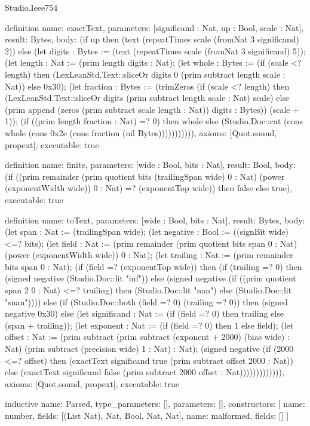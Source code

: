 \begin{lexlean}{Studio.Ieee754}
\begin{semanticmodule}
definition{
  name: exactText,
  parameters: [significand : Nat, up : Bool, scale : Nat],
  result: Bytes,
  body: (if up then (text (repeatTimes scale (fromNat 3 significand) 2)) else (let digits : Bytes := (text (repeatTimes scale (fromNat 3 significand) 5)); (let length : Nat := (prim length digits : Nat); (let whole : Bytes := (if (scale <? length) then (LexLeanStd.Text::sliceOr digits 0 (prim subtract length scale : Nat)) else 0x30); (let fraction : Bytes := (trimZeros (if (scale <? length) then (LexLeanStd.Text::sliceOr digits (prim subtract length scale : Nat) scale) else (prim append (zeros (prim subtract scale length : Nat)) digits : Bytes)) (scale + 1)); (if ((prim length fraction : Nat) =? 0) then whole else (Studio.Doc::cat (cons whole (cons 0x2e (cons fraction (nil Bytes))))))))))),
  axioms: [Quot.sound, propext],
  executable: true
}

definition{
  name: finite,
  parameters: [wide : Bool, bits : Nat],
  result: Bool,
  body: (if ((prim remainder (prim quotient bits (trailingSpan wide) 0 : Nat) (power (exponentWidth wide)) 0 : Nat) =? (exponentTop wide)) then false else true),
  executable: true
}

definition{
  name: toText,
  parameters: [wide : Bool, bits : Nat],
  result: Bytes,
  body: (let span : Nat := (trailingSpan wide); (let negative : Bool := ((signBit wide) <=? bits); (let field : Nat := (prim remainder (prim quotient bits span 0 : Nat) (power (exponentWidth wide)) 0 : Nat); (let trailing : Nat := (prim remainder bits span 0 : Nat); (if (field =? (exponentTop wide)) then (if (trailing =? 0) then (signed negative (Studio.Doc::lit "inf")) else (signed negative (if ((prim quotient span 2 0 : Nat) <=? trailing) then (Studio.Doc::lit "nan") else (Studio.Doc::lit "snan")))) else (if (Studio.Doc::both (field =? 0) (trailing =? 0)) then (signed negative 0x30) else (let significand : Nat := (if (field =? 0) then trailing else (span + trailing)); (let exponent : Nat := (if (field =? 0) then 1 else field); (let offset : Nat := (prim subtract (prim subtract (exponent + 2000) (bias wide) : Nat) (prim subtract (precision wide) 1 : Nat) : Nat); (signed negative (if (2000 <=? offset) then (exactText significand true (prim subtract offset 2000 : Nat)) else (exactText significand false (prim subtract 2000 offset : Nat))))))))))))),
  axioms: [Quot.sound, propext],
  executable: true
}

inductive{
  name: Parsed,
  type_parameters: [],
  parameters: [],
  constructors: [
    {name: number, fields: [(List Nat), Nat, Bool, Nat, Nat]},
    {name: malformed, fields: []}
  ]
}


\end{semanticmodule}
\end{lexlean}
